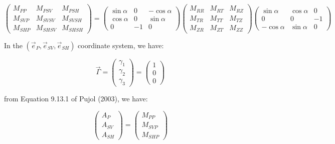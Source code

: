 \documentclass[methods.tex]{subfiles}
\begin{document}
\begin{equation}
\begin{pmatrix}
M_{PP} & M_{PSV} & M_{PSH} \\
M_{SVP} & M_{SVSV} & M_{SVSH} \\
M_{SHP} & M_{SHSV} & M_{SHSH}
\end{pmatrix} = \begin{pmatrix}
\sin \alpha & 0 & - \cos \alpha \\
\cos \alpha & 0 & \sin \alpha \\
0 & - 1 & 0
\end{pmatrix} \begin{pmatrix}
M_{RR} & M_{RT} & M_{RZ} \\
M_{TR} & M_{TT} & M_{TZ} \\
M_{ZR} & M_{ZT} & M_{ZZ}
\end{pmatrix} \begin{pmatrix}
\sin \alpha & \cos \alpha & 0 \\
0 & 0 & - 1 \\
- \cos \alpha & \sin \alpha & 0
\end{pmatrix}
\end{equation}

In the $(\vec{e}_P, \vec{e}_{SV}, \vec{e}_{SH})$ coordinate system, we have:

\begin{equation}
\vec{\Gamma} = \begin{pmatrix}
\gamma_1 \\
\gamma_2 \\
\gamma_3
\end{pmatrix} = \begin{pmatrix}
1 \\
0 \\
0
\end{pmatrix}
\end{equation}

from Equation 9.13.1 of Pujol (2003), we have:

\begin{equation}
\begin{pmatrix}
A_P \\
A_{SV} \\
A_{SH}
\end{pmatrix} =\begin{pmatrix}
M_{PP} \\
M_{SVP} \\
M_{SHP}
\end{pmatrix}
\end{equation}
\end{document}
